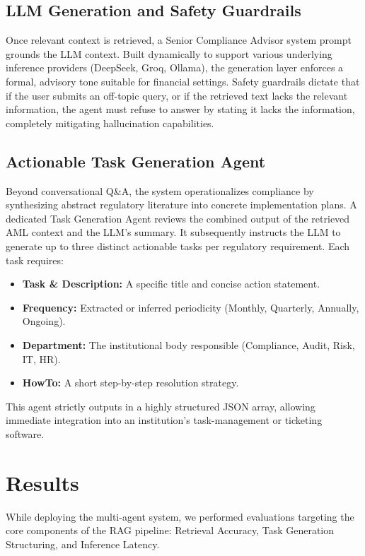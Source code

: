 ﻿\documentclass[conference]{IEEEtran}
\begin{document}
\subsection{LLM Generation and Safety Guardrails}
Once relevant context is retrieved, a Senior Compliance Advisor system prompt grounds the LLM context. Built dynamically to support various underlying inference providers (DeepSeek, Groq, Ollama), the generation layer enforces a formal, advisory tone suitable for financial settings. Safety guardrails dictate that if the user submits an off-topic query, or if the retrieved text lacks the relevant information, the agent must refuse to answer by stating it lacks the information, completely mitigating hallucination capabilities.

\subsection{Actionable Task Generation Agent}
Beyond conversational Q\&A, the system operationalizes compliance by synthesizing abstract regulatory literature into concrete implementation plans. A dedicated Task Generation Agent reviews the combined output of the retrieved AML context and the LLM's summary. It subsequently instructs the LLM to generate up to three distinct actionable tasks per regulatory requirement. Each task requires:
\begin{itemize}
    \item \textbf{Task \& Description:} A specific title and concise action statement.
    \item \textbf{Frequency:} Extracted or inferred periodicity (Monthly, Quarterly, Annually, Ongoing).
    \item \textbf{Department:} The institutional body responsible (Compliance, Audit, Risk, IT, HR).
    \item \textbf{HowTo:} A short step-by-step resolution strategy.
\end{itemize}
This agent strictly outputs in a highly structured JSON array, allowing immediate integration into an institution's task-management or ticketing software.

\section{Results}
While deploying the multi-agent system, we performed evaluations targeting the core components of the RAG pipeline: Retrieval Accuracy, Task Generation Structuring, and Inference Latency. 
\end{document}
